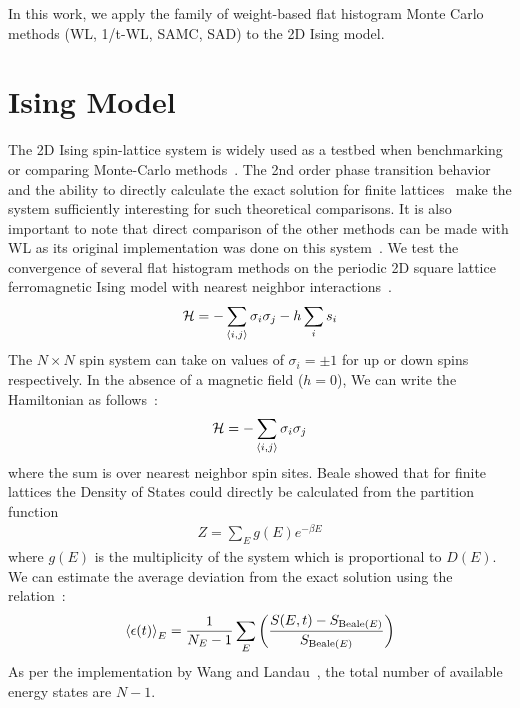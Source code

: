 \documentclass[letterpaper,twocolumn,amsmath,amssymb,pre,aps,10pt]{revtex4-1}
\begin{document}
In this work, we apply the family of weight-based flat histogram Monte
Carlo methods (WL, 1/t-WL, SAMC, SAD) to the 2D Ising model.

\section{Ising Model}
The 2D Ising spin-lattice system is widely used as a testbed when
benchmarking or comparing Monte-Carlo
methods~\cite{ferdinand1969bounded, wang1999transition, trebst2004optimizing}. The 2nd order
phase transition behavior and the ability to directly calculate the
exact solution for finite lattices~\cite{beale1996exact} make the
system sufficiently interesting for such theoretical comparisons. It is
also important to note that direct comparison of the other methods can
be made with WL as its original implementation was done on this
system~\cite{wang2001determining,wang2001efficient}.
We test the convergence of several flat histogram methods
on the periodic 2D square lattice ferromagnetic Ising model with nearest
neighbor interactions~\cite{landau2004new}.
\begin{align}
\mathcal{H} = -\sum_{\braket{i,j}} \sigma_i \sigma_j - h \sum_i s_i
\end{align}
The $N\times N$ spin system can take on values of $\sigma_i = \pm 1$
for up or down spins respectively. In the absence of a magnetic field ($h =
0$), We can write the Hamiltonian as follows~\cite{onsager1944crystal,
kaufman1949crystal}:
\begin{align}
\mathcal{H} = -\sum_{\braket{i,j}} \sigma_i \sigma_j
\end{align}
where the sum is over nearest neighbor spin sites. Beale showed that for finite
lattices the Density of States could directly be calculated from the partition
function~\cite{beale1996exact}
\begin{align}
Z = \sum_E g(E) e^{-{\beta E}}
\end{align}
where $g(E)$ is the multiplicity of the system which is proportional to
$D(E)$. We can estimate the average deviation from the exact solution
using the relation~\cite{schneider2017convergence, shakirov2018convergence,
barash2017control}:
\begin{align}
\braket{\epsilon(t)}_E = \frac{1}{N_E - 1} \sum_E \left( \frac{S(E,t) - S_{\text{Beale}(E)}}{S_{\text{Beale}(E)}} \right)
\end{align}
As per the implementation by Wang and
Landau~\cite{wang2001determining}, the total number of available energy
states are $N-1$.
\end{document}
